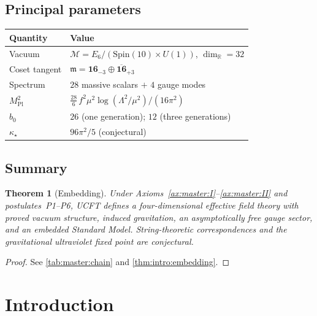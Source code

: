 \documentclass[11pt]{article}
\theoremstyle{plain}
\newtheorem{theorem}{Theorem}[section]
\theoremstyle{definition}
\theoremstyle{remark}
\begin{document}
\subsection{Principal parameters}
\label{sec:master:numbers}

\begin{center}
\small
\begin{tabular}{@{}ll@{}}
\toprule
Quantity & Value \\
\midrule
Vacuum & $\mathcal M=E_6/(\mathrm{Spin}(10)\times U(1))$, $\dim_{\mathbb R}=32$ \\
Coset tangent & $\mathfrak m=\mathbf{16}_{-3}\oplus\overline{\mathbf{16}}_{+3}$ \\
Spectrum & $28$ massive scalars $+$ $4$ gauge modes \\
$M_{\mathrm{Pl}}^2$ &
  $\tfrac{28}{6}\,f^2\mu^2\log(\Lambda^2/\mu^2)/(16\pi^2)$ \\
$b_0$ & $26$ (one generation); $12$ (three generations) \\
$\kappa_\star$ & $96\pi^2/5$ (conjectural) \\
\bottomrule
\end{tabular}
\end{center}

\subsection{Summary}
\label{sec:master:summary}

\begin{theorem}[Embedding]\label{thm:master:embedding}
Under Axioms~\autoref{ax:master:I}--\autoref{ax:master:II} and
postulates~\textnormal{P1--P6}, UCFT defines a four-dimensional effective field
theory with proved vacuum structure, induced gravitation, an asymptotically free
gauge sector, and an embedded Standard Model. String-theoretic correspondences
and the gravitational ultraviolet fixed point are conjectural.
\end{theorem}

\begin{proof}
See \autoref{tab:master:chain} and \autoref{thm:intro:embedding}.
\end{proof}

\clearpage%
\section{Introduction}
\label{sec:intro:main}
\end{document}
